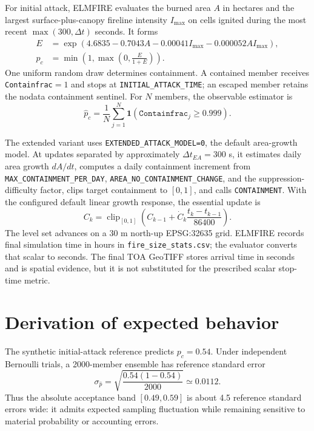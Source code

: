For initial attack, ELMFIRE evaluates the burned area $A$ in hectares and the largest surface-plus-canopy fireline intensity $I_{\max}$ on cells ignited during the most recent $\max(300,\Delta t)$ seconds. It forms
\begin{align}
E &= \exp\!\left(4.6835-0.7043A-0.00041I_{\max}-0.000052AI_{\max}\right),\\
p_c &= \min\!\left(1,\max\!\left(0,\frac{E}{1+E}\right)\right).
\end{align}
One uniform random draw determines containment. A contained member receives \texttt{Containfrac}$=1$ and stops at \texttt{INITIAL\_ATTACK\_TIME}; an escaped member retains the nodata containment sentinel. For $N$ members, the observable estimator is
\begin{equation}
\widehat p_c=\frac{1}{N}\sum_{j=1}^{N}\mathbf{1}(\texttt{Containfrac}_j\ge0.999).
\end{equation}

The extended variant uses \texttt{EXTENDED\_ATTACK\_MODEL=0}, the default area-growth model. At updates separated by approximately $\Delta t_{EA}=300$ s, it estimates daily area growth $dA/dt$, computes a daily containment increment from \texttt{MAX\_CONTAINMENT\_PER\_DAY}, \texttt{AREA\_NO\_CONTAINMENT\_CHANGE}, and the suppression-difficulty factor, clips target containment to $[0,1]$, and calls \texttt{CONTAINMENT}. With the configured default linear growth response, the essential update is
\begin{equation}
C_{k}=\operatorname{clip}_{[0,1]}\!\left(C_{k-1}+\dot C_k\frac{t_k-t_{k-1}}{86400}\right).
\end{equation}
The level set advances on a 30 m north-up EPSG:32635 grid. ELMFIRE records final simulation time in hours in \texttt{fire\_size\_stats.csv}; the evaluator converts that scalar to seconds. The final TOA GeoTIFF stores arrival time in seconds and is spatial evidence, but it is not substituted for the prescribed scalar stop-time metric.

\section{Derivation of expected behavior}

The synthetic initial-attack reference predicts $p_c=0.54$. Under independent Bernoulli trials, a 2000-member ensemble has reference standard error
\begin{equation}
\sigma_{\widehat p}=\sqrt{\frac{0.54(1-0.54)}{2000}}\simeq0.0112.
\end{equation}
Thus the absolute acceptance band $[0.49,0.59]$ is about 4.5 reference standard errors wide: it admits expected sampling fluctuation while remaining sensitive to material probability or accounting errors.


